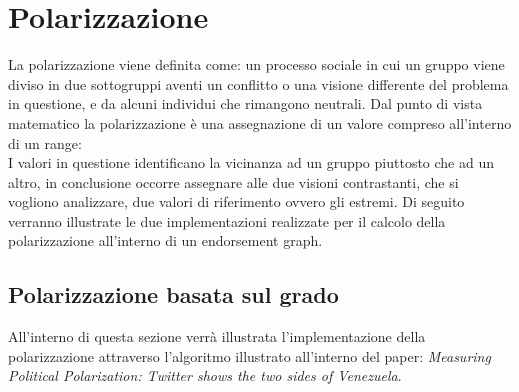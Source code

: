 \section{Polarizzazione}
\label{Polarizzazione}
La polarizzazione viene definita come: 
un processo sociale in cui un gruppo viene diviso in due sottogruppi aventi un conflitto o una visione differente del problema in questione, e da alcuni individui che rimangono neutrali.
Dal punto di vista matematico la polarizzazione è una assegnazione di un valore compreso all'interno di un range:
\begin{equation}
[-1,1]
\end{equation}
I valori in questione identificano la vicinanza ad un gruppo piuttosto che ad un altro, in conclusione occorre assegnare alle due visioni contrastanti, che si vogliono analizzare, due valori di riferimento ovvero gli estremi.
Di seguito verranno illustrate le due implementazioni realizzate per il calcolo della polarizzazione all'interno di un endorsement graph.

\subsection{Polarizzazione basata sul grado}
All'interno di questa sezione verrà illustrata l'implementazione della polarizzazione attraverso l'algoritmo illustrato all'interno del paper: \textit{Measuring Political Polarization: Twitter shows the two sides of Venezuela}.\cite{morales2015polarization}

